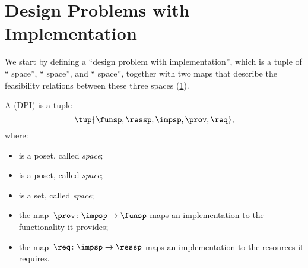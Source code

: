 
\section[DPIs]{Design Problems with Implementation}
\label{sec:Design-Problems}
We start by defining a ``design problem with implementation'', which is a tuple of `` space'', `` space'', and `` space'', together with two maps that describe the feasibility relations between these three spaces (\cref{fig:setup}).

\begin{definition}
    \label{def:DPI}
    A \emph{} (DPI) is a tuple
    \begin{equation}
        \tup{\funsp, \ressp, \impsp, \prov,\req},
    \end{equation}
    where:
    \begin{itemize}
        \item \funsp is a poset, called \emph{ space};
        \item \ressp is a poset, called \emph{ space};
        \item \impsp is a set, called \emph{ space};
        \item the map~$\prov\colon\impsp\to\funsp$
              maps an implementation to the functionality it provides;
        \item the map~$\req\colon\impsp\to\ressp$
              maps an implementation to the resources it requires.
    \end{itemize}

\end{definition}

\begin{figure}[h]
    \centering
    \caption{}
    \label{fig:setup}
\end{figure}

